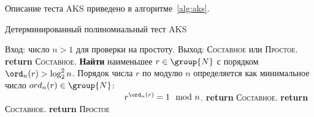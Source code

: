 Описание теста AKS приведено в алгоритме~\ref{alg:aks}.

\begin{algorithm}[!ht]
    \caption{Детерминированный полиномиальный тест AKS\label{alg:aks}}
    \begin{algorithmic}
        \STATE Вход: число $n>1$ для проверки на простоту.
        \STATE Выход: \textsc{Составное} или \textsc{Простое}.
           \STATE \textbf{return} \textsc{Составное}.
        \ENDIF
        \STATE \textbf{Найти} наименьшее $r \in \group{N}$ с порядком $\ord_n(r) > \log_2^2 n$. Порядок числа $r$ по модулю $n$ определяется как минимальное число $ord_n(r) \in \group{N}$: \\
            \indent ~~~~~~~~~~~~~~~~~~~~~~~~~~~ $r^{\ord_n(r)} = 1 \mod n$.
           \STATE \textbf{return} \textsc{Составное}.
        \ENDIF
                \STATE \textbf{return} \textsc{Составное}.
            \ENDIF
        \ENDFOR
        \STATE \textbf{return} \textsc{Простое}
    \end{algorithmic}
\end{algorithm}
